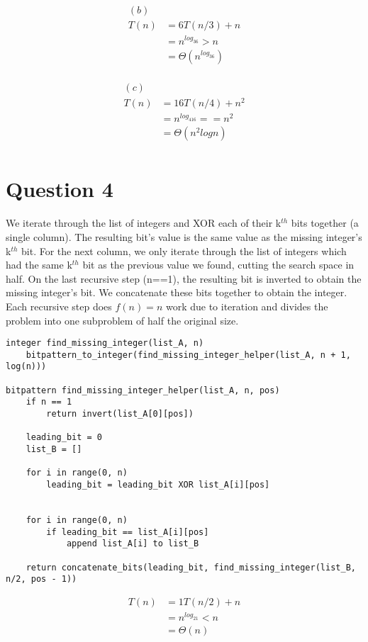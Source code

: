 \documentclass[11pt, oneside]{article}
\begin{document}
\begin{align*} 
(b) \\
T(n) &= 6T(n/3) + n \\
&= n^{log_36} > n \\
&= \Theta(n^{log_36}) \\
\end{align*}

\begin{align*} 
(c) \\
T(n) &= 16T(n/4) + n^2 \\
&= n^{log_416} == n^2 \\
&= \Theta(n^2logn) \\
\end{align*}

\clearpage

\section{Question 4}

We iterate through the list of integers and XOR each of their k$^{th}$ bits together (a single column). The resulting bit's value is the same value as the missing integer's k$^{th}$ bit. For the next column, we only iterate through the list of integers which had the same k$^{th}$ bit as the previous value we found, cutting the search space in half. On the last recursive step (n==1), the resulting bit is inverted to obtain the missing integer's bit. We concatenate these bits together to obtain the integer. Each recursive step does $f(n)=n$ work due to iteration and divides the problem into one subproblem of half the original size.

\begin{lstlisting}
integer find_missing_integer(list_A, n)
    bitpattern_to_integer(find_missing_integer_helper(list_A, n + 1, log(n)))

bitpattern find_missing_integer_helper(list_A, n, pos)
    if n == 1
        return invert(list_A[0][pos])

    leading_bit = 0
    list_B = []

    for i in range(0, n)
        leading_bit = leading_bit XOR list_A[i][pos]


    for i in range(0, n)
        if leading_bit == list_A[i][pos]
            append list_A[i] to list_B

    return concatenate_bits(leading_bit, find_missing_integer(list_B, n/2, pos - 1))
\end{lstlisting}

\begin{align*} 
T(n) &= 1T(n/2) + n \\
&= n^{log_21} < n \\
&= \Theta(n) \\
\end{align*}

\clearpage
\end{document}
